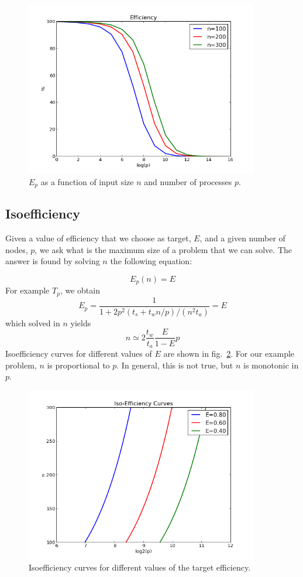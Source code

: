 \documentclass[justified,sixbynine]{tufte-book}
\theoremstyle{plain}%
\theoremstyle{definition}
\theoremstyle{remark}
\begin{document}
\begin{fullwidth}
\begin{figure}[ht]
\centering\includegraphics[width=4in]{images/Ep.png}
\caption{$E_p$ as a function of input size $n$ and number of processes $p$.\label{Ep}}
\end{figure}

\goodbreak\subsection{Isoefficiency}

Given a value of efficiency that we choose as target, $E$, and a given number of nodes, $p$, we ask what is the maximum size of a problem that we can solve. The answer is found by solving $n$ the following equation:

\begin{equation}
E_p(n) = E
\end{equation}
For example $T_p$, we obtain
\begin{equation}
E_p = \frac1{1 + 2p^2(t_s + t_w n/p)/(n^2 t_a)} = E
\end{equation}
which solved in $n$ yields
\begin{equation}
n \simeq 2 \frac{t_w}{t_a} \frac{E}{1-E} p
\end{equation}
Isoefficiency curves for different values of $E$ are shown in fig.~\ref{Ip}.
For our example problem, $n$ is proportional to $p$. In general, this is not true, but $n$ is monotonic in $p$.

\begin{figure}[ht]
\centering\includegraphics[width=4in]{images/Ip.png}
\caption{Isoefficiency curves for different values of the target efficiency.\label{Ip}}
\end{figure}


\end{fullwidth}
\end{document}

